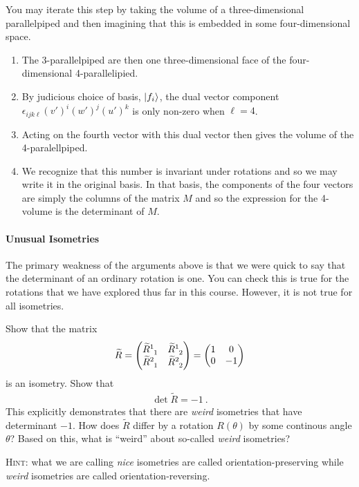 \documentclass[12pt, oneside]{report}    %
\begin{document}
You may iterate this step by taking the volume of a three-dimensional parallelpiped and then imagining that this is embedded in some four-dimensional space. 
\begin{enumerate}
    \item The 3-parallelpiped are then one three-dimensional face of the four-dimensional 4-parallelipied.
    \item  By judicious choice of basis, $\left|f_i\right\rangle$, the dual vector component $\epsilon_{ijk\ell}(v')^i(w')^j(u')^k$ is only non-zero when $\ell=4$.
    \item  Acting on the fourth vector with this dual vector then gives the volume of the 4-paralellpiped.
    \item  We recognize that this number is invariant under rotations and so we may write it in the original basis. In that basis, the components of the four vectors are simply the columns of the matrix $M$ and so the expression for the 4-volume is the determinant of $M$.
\end{enumerate}


\paragraph{Unusual Isometries} The primary weakness of the arguments above is that we were quick to say that the determinant of an ordinary rotation is one. You can check this is true for the rotations that we have explored thus far in this course. However, it is not true for all isometries. 
\begin{exercise}\label{ex:orientation:2d}
Show that the matrix
\begin{align}
    \tilde R = 
    \begin{pmatrix}
        \tilde R\aij{1}{1} & \tilde R\aij{1}{2}\\
        \tilde R\aij{2}{1} & \tilde R\aij{2}{2}
    \end{pmatrix}
    =
    \begin{pmatrix}
     1 & 0 \\
     0 & -1   
    \end{pmatrix}
\end{align}
is an isometry. Show that
\begin{align}
    \det \tilde R = -1 \ .
\end{align}
This explicitly demonstrates that there are \emph{weird} isometries that have determinant $-1$. How does $\tilde R$ differ by a rotation $R(\theta)$ by some continous angle $\theta$? Based on this, what is ``weird'' about so-called \emph{weird} isometries?

\textsc{Hint:} what we are calling \emph{nice} isometries are called orientation-preserving while \emph{weird} isometries are called orientation-reversing.
\end{exercise}
\end{document}
